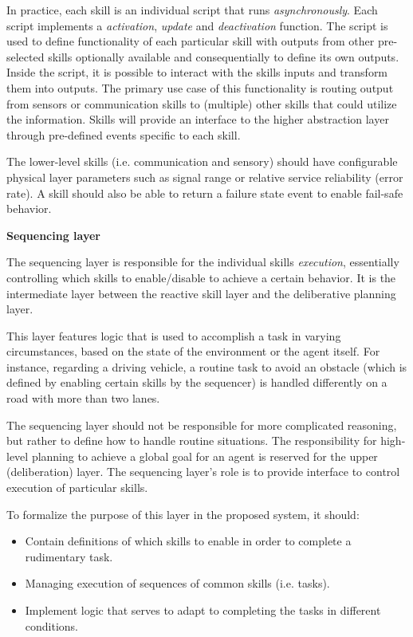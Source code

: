 \documentclass[0main.tex]{subfiles}
\begin{document}
In practice, each skill is an individual script that runs \emph{asynchronously}.
Each script implements a \emph{activation}, \emph{update} and \emph{deactivation} function.
The script is used to define functionality of each particular skill with outputs from other pre-selected skills 
optionally available and consequentially to define its own outputs.
Inside the script, it is possible to interact with the skills inputs and transform them into 
outputs. The primary use case of this functionality is routing output from sensors or communication skills
to (multiple) other skills that could utilize the information. Skills will provide an interface to the higher abstraction layer 
through pre-defined events specific to each skill.

The lower-level skills (i.e. communication and sensory) should 
have configurable physical layer parameters such as signal range or relative service
reliability (error rate). A skill should also be able to return a
failure state event to enable fail-safe behavior. \pagebreak

\textbf{Sequencing layer}

The sequencing layer is responsible for the individual skills \emph{execution}, essentially 
controlling which skills to enable/disable to achieve a certain behavior. It is the 
intermediate layer between the reactive skill layer and the deliberative planning layer. 

This layer features logic that is used to accomplish a task in varying circumstances, 
based on the state of the environment or the agent itself. For instance, regarding a driving 
vehicle, a routine task to avoid an obstacle (which is defined by enabling certain skills by
the sequencer) is handled differently on a road with more than two lanes.

The sequencing layer should not be responsible for more complicated reasoning, but rather 
to define how to handle routine situations. The responsibility for high-level planning to achieve 
a global goal for an agent is reserved for the upper (deliberation) layer. The sequencing layer's 
role is to provide interface to control execution of particular skills.

To formalize the purpose of this layer in the proposed system, it should:

\begin{itemize}
    \item Contain definitions of which skills to enable in order to complete a rudimentary task.
    \item Managing execution of sequences of common skills (i.e. tasks).
    \item Implement logic that serves to adapt to completing the tasks in different conditions.
\end{itemize}
\end{document}
